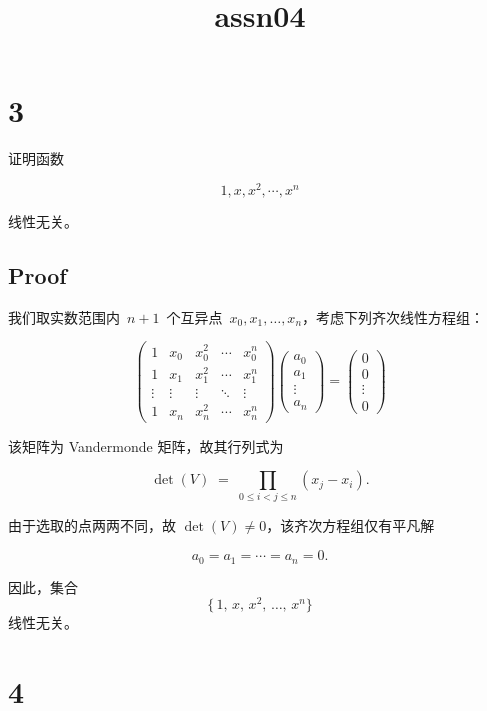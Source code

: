 \documentclass[11pt]{article}
\title{assn04}
\begin{document}
    
    \maketitle
    
    

    
    \section{3}\label{section}

证明函数

\[
1,x,x^2,\cdots, x^n
\]

线性无关。

    \subsection{Proof}\label{proof}

我们取实数范围内~\(n+1\)~个互异点~\(x_0, x_1, \dots, x_n\)，考虑下列齐次线性方程组：

\[
\begin{pmatrix}
1 & x_0 & x_0^2 & \cdots & x_0^n \\
1 & x_1 & x_1^2 & \cdots & x_1^n \\
\vdots & \vdots & \vdots & \ddots & \vdots \\
1 & x_n & x_n^2 & \cdots & x_n^n
\end{pmatrix}
\begin{pmatrix}
a_0\\
a_1\\
\vdots\\
a_n
\end{pmatrix}
=\begin{pmatrix}
0\\
0\\
\vdots\\
0
\end{pmatrix}
\]

该矩阵为 Vandermonde 矩阵，故其行列式为

\[
\det(V) \;=\; \prod_{0 \le i < j \le n} (x_j - x_i).
\]

由于选取的点两两不同，故 \(\det(V)\neq 0\)，该齐次方程组仅有平凡解

\[
a_0 = a_1 = \cdots = a_n = 0.
\]

因此，集合 \[
\{\,1,\,x,\,x^2,\,\dots,\,x^n\}
\] 线性无关。

    \section{4}\label{section}
\end{document}
